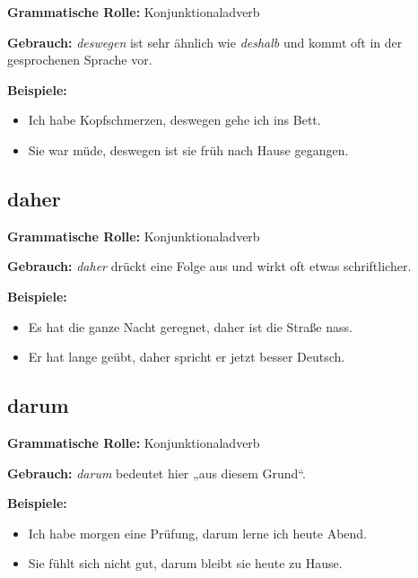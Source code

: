 \documentclass[a4paper]{article}
\begin{document}
            \textbf{Grammatische Rolle:} Konjunktionaladverb
            
            \textbf{Gebrauch:} \emph{deswegen} ist sehr ähnlich wie \emph{deshalb} und kommt oft in der gesprochenen Sprache vor.
            
            \textbf{Beispiele:}
            \begin{itemize}
                \item Ich habe Kopfschmerzen, deswegen gehe ich ins Bett.
                \item Sie war müde, deswegen ist sie früh nach Hause gegangen.
            \end{itemize}
        
        \subsection{daher}
            
            \textbf{Grammatische Rolle:} Konjunktionaladverb
            
            \textbf{Gebrauch:} \emph{daher} drückt eine Folge aus und wirkt oft etwas schriftlicher.
            
            \textbf{Beispiele:}
            \begin{itemize}
                \item Es hat die ganze Nacht geregnet, daher ist die Straße nass.
                \item Er hat lange geübt, daher spricht er jetzt besser Deutsch.
            \end{itemize}
        
        \subsection{darum}
            
            \textbf{Grammatische Rolle:} Konjunktionaladverb
            
            \textbf{Gebrauch:} \emph{darum} bedeutet hier „aus diesem Grund“.
            
            \textbf{Beispiele:}
            \begin{itemize}
                \item Ich habe morgen eine Prüfung, darum lerne ich heute Abend.
                \item Sie fühlt sich nicht gut, darum bleibt sie heute zu Hause.
            \end{itemize}
    
\end{document}
